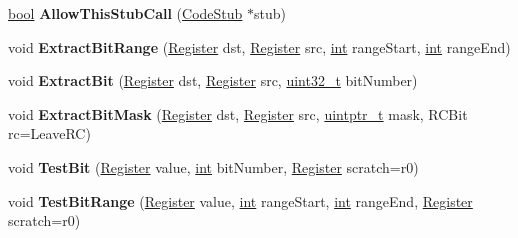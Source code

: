 \begin{DoxyCompactItemize}
\mbox{\hyperlink{classbool}{bool}} {\bfseries Allow\+This\+Stub\+Call} (\mbox{\hyperlink{classv8_1_1internal_1_1CodeStub}{Code\+Stub}} $\ast$stub)
\item 
\mbox{\label{classv8_1_1internal_1_1TurboAssembler_af94970950c433c07d308b4baf807f367}} 
void {\bfseries Extract\+Bit\+Range} (\mbox{\hyperlink{classv8_1_1internal_1_1Register}{Register}} dst, \mbox{\hyperlink{classv8_1_1internal_1_1Register}{Register}} src, \mbox{\hyperlink{classint}{int}} range\+Start, \mbox{\hyperlink{classint}{int}} range\+End)
\item 
\mbox{\label{classv8_1_1internal_1_1TurboAssembler_a2901b8f872ea55fd2c9c660677e292ae}} 
void {\bfseries Extract\+Bit} (\mbox{\hyperlink{classv8_1_1internal_1_1Register}{Register}} dst, \mbox{\hyperlink{classv8_1_1internal_1_1Register}{Register}} src, \mbox{\hyperlink{classuint32__t}{uint32\+\_\+t}} bit\+Number)
\item 
\mbox{\label{classv8_1_1internal_1_1TurboAssembler_a945f7c3d713f7813c5be5a7da6945f1b}} 
void {\bfseries Extract\+Bit\+Mask} (\mbox{\hyperlink{classv8_1_1internal_1_1Register}{Register}} dst, \mbox{\hyperlink{classv8_1_1internal_1_1Register}{Register}} src, \mbox{\hyperlink{classuintptr__t}{uintptr\+\_\+t}} mask, R\+C\+Bit rc=Leave\+RC)
\item 
\mbox{\label{classv8_1_1internal_1_1TurboAssembler_a142e9f6529cb78da4e5833de201143b7}} 
void {\bfseries Test\+Bit} (\mbox{\hyperlink{classv8_1_1internal_1_1Register}{Register}} value, \mbox{\hyperlink{classint}{int}} bit\+Number, \mbox{\hyperlink{classv8_1_1internal_1_1Register}{Register}} scratch=r0)
\item 
\mbox{\label{classv8_1_1internal_1_1TurboAssembler_ad822d61af1c537f90b6569f9fc072e0d}} 
void {\bfseries Test\+Bit\+Range} (\mbox{\hyperlink{classv8_1_1internal_1_1Register}{Register}} value, \mbox{\hyperlink{classint}{int}} range\+Start, \mbox{\hyperlink{classint}{int}} range\+End, \mbox{\hyperlink{classv8_1_1internal_1_1Register}{Register}} scratch=r0)
\item 
\mbox{\label{classv8_1_1internal_1_1TurboAssembler_a6c2528f8d87c515466193a1a4e7889a7}} 

\end{DoxyCompactItemize}
